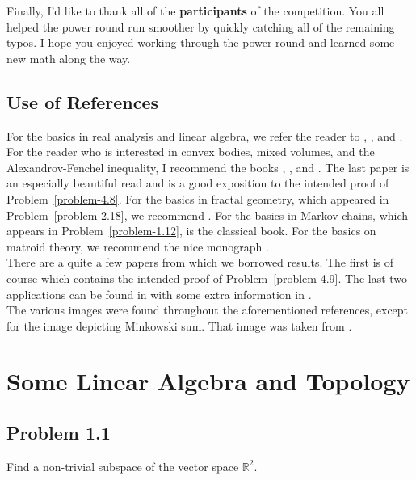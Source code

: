 \documentclass[12pt]{article}
\begin{document}
Finally, I'd like to thank all of the \textbf{participants} of the competition. You all helped the power round run smoother by quickly catching all of the remaining typos. I hope you enjoyed working through the power round and learned some new math along the way. 


\subsection{Use of References}

For the basics in real analysis and linear algebra, we refer the reader to \cite{baby-rudin}, \cite{stein}, and \cite{axler}. For the reader who is interested in convex bodies, mixed volumes, and the Alexandrov-Fenchel inequality, I recommend the books \cite{schneider_2013}, \cite{Hug2020}, and \cite{Gardner}. The last paper \cite{Gardner} is an especially beautiful read and is a good exposition to the intended proof of Problem~\ref{problem-4.8}. For the basics in fractal geometry, which appeared in Problem~\ref{problem-2.18}, we recommend \cite{Falconer}. For the basics in Markov chains, which appears in Problem~\ref{problem-1.12}, \cite{Levin2017-aj} is the classical book. For the basics on matroid theory, we recommend the nice monograph \cite{oxley}. \\

There are a quite a few papers from which we borrowed results. The first is of course \cite{bochner} which contains the intended proof of Problem~\ref{problem-4.9}. The last two applications can be found in \cite{Stanley1981TwoCA} with some extra information in \cite{Stanley1986}. \\

The various images were found throughout the aforementioned references, except for the image depicting Minkowski sum. That image was taken from \cite{article}. 


\newpage
\section{Some Linear Algebra and Topology}
\subsection{Problem 1.1}

\begin{problem}
	Find a non-trivial subspace of the vector space $\mathbb{R}^2$. 
\end{problem}
\end{document}

